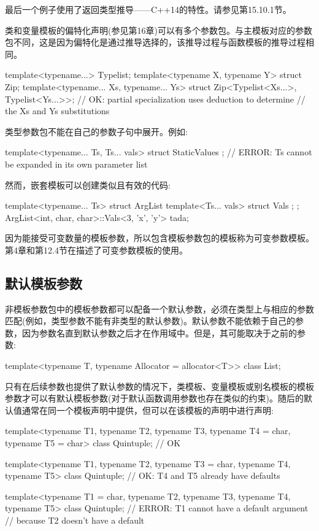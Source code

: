 最后一个例子使用了返回类型推导——C++14的特性。请参见第15.10.1节。

类和变量模板的偏特化声明(参见第16章)可以有多个参数包。与主模板对应的参数包不同，这是因为偏特化是通过推导选择的，该推导过程与函数模板的推导过程相同。

\begin{cpp}
template<typename...> Typelist;
template<typename X, typename Y> struct Zip;
template<typename... Xs, typename... Ys>
	struct Zip<Typelist<Xs...>, Typelist<Ys...>>;
	// OK: partial specialization uses deduction to determine
	// the Xs and Ys substitutions
\end{cpp}

类型参数包不能在自己的参数子句中展开。例如:

\begin{cpp}
template<typename... Ts, Ts... vals> struct StaticValues {};
// ERROR: Ts cannot be expanded in its own parameter list
\end{cpp}

然而，嵌套模板可以创建类似且有效的代码:

\begin{cpp}
template<typename... Ts> struct ArgList {
	template<Ts... vals> struct Vals {};
};
ArgList<int, char, char>::Vals<3, ’x’, ’y’> tada;
\end{cpp}

因为能接受可变数量的模板参数，所以包含模板参数包的模板称为可变参数模板。第4章和第12.4节在描述了可变参数模板的使用。

\subsection{默认模板参数}

非模板参数包中的模板参数都可以配备一个默认参数，必须在类型上与相应的参数匹配(例如，类型参数不能有非类型的默认参数)。默认参数不能依赖于自己的参数，因为参数名直到默认参数之后才在作用域中。但是，其可能取决于之前的参数:

\begin{cpp}
template<typename T, typename Allocator = allocator<T>>
class List;
\end{cpp}

只有在后续参数也提供了默认参数的情况下，类模板、变量模板或别名模板的模板参数才可以有默认模板参数(对于默认函数调用参数也存在类似的约束)。随后的默认值通常在同一个模板声明中提供，但可以在该模板的声明中进行声明:

\begin{cpp}
template<typename T1, typename T2, typename T3,
typename T4 = char, typename T5 = char>
class Quintuple; // OK

template<typename T1, typename T2, typename T3 = char,
typename T4, typename T5>
class Quintuple; // OK: T4 and T5 already have defaults

template<typename T1 = char, typename T2, typename T3,
typename T4, typename T5>
class Quintuple; // ERROR: T1 cannot have a default argument
// because T2 doesn’t have a default
\end{cpp}

